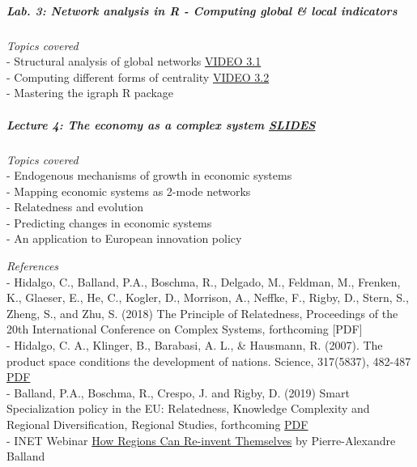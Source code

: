 \documentclass[
]{article}
\begin{document}
\hypertarget{lab.-3-network-analysis-in-r---computing-global-local-indicators}{%
\subparagraph{\texorpdfstring{\textbf{Lab. 3: Network analysis in R -
Computing global \& local
indicators}}{Lab. 3: Network analysis in R - Computing global \& local indicators}}\label{lab.-3-network-analysis-in-r---computing-global-local-indicators}}

\emph{Topics covered}\\
- Structural analysis of global networks
\href{https://www.youtube.com/watch?v=JI3ibVmeopU\&feature=youtu.be}{VIDEO
3.1}\\
- Computing different forms of centrality
\href{https://youtu.be/57kuxJ-dVAI}{VIDEO 3.2}\\
- Mastering the igraph R package

\hypertarget{lecture-4-the-economy-as-a-complex-system-slides}{%
\subparagraph{\texorpdfstring{\textbf{Lecture 4: The economy as a
complex system}
\href{https://github.com/PABalland/PABalland.github.io/raw/master/teaching/on/L4.pdf}{SLIDES}}{Lecture 4: The economy as a complex system SLIDES}}\label{lecture-4-the-economy-as-a-complex-system-slides}}

\emph{Topics covered}\\
- Endogenous mechanisms of growth in economic systems\\
- Mapping economic systems as 2-mode networks\\
- Relatedness and evolution\\
- Predicting changes in economic systems\\
- An application to European innovation policy

\emph{References}\\
- Hidalgo, C., Balland, P.A., Boschma, R., Delgado, M., Feldman, M.,
Frenken, K., Glaeser, E., He, C., Kogler, D., Morrison, A., Neffke, F.,
Rigby, D., Stern, S., Zheng, S., and Zhu, S. (2018) The Principle of
Relatedness, Proceedings of the 20th International Conference on Complex
Systems, forthcoming {[}PDF{]}\\
- Hidalgo, C. A., Klinger, B., Barabasi, A. L., \& Hausmann, R. (2007).
The product space conditions the development of nations. Science,
317(5837), 482-487 \href{http://barabasi.com/f/220.pdf}{PDF}\\
- Balland, P.A., Boschma, R., Crespo, J. and Rigby, D. (2019) Smart
Specialization policy in the EU: Relatedness, Knowledge Complexity and
Regional Diversification, Regional Studies, forthcoming
\href{https://2c2e773f-85c0-4039-818c-ea517fc75085.filesusr.com/ugd/c5611b_94433b170c40428d9fea06a58dcef6d1.pdf}{PDF}\\
- INET Webinar \href{https://www.youtube.com/watch?v=BmMTvj6IWRk}{How
Regions Can Re-invent Themselves} by Pierre-Alexandre Balland
\end{document}
